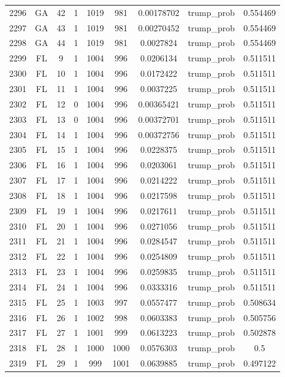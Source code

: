 \documentclass[12pt,a4paper]{article}
\begin{document}
\begin{tabular}{r|cccccccc}
	2296 & GA & 42 & 1 & 1019 & 981 & 0.00178702 & trump\_prob & 0.554469 \\
	2297 & GA & 43 & 1 & 1019 & 981 & 0.00270452 & trump\_prob & 0.554469 \\
	2298 & GA & 44 & 1 & 1019 & 981 & 0.0027824 & trump\_prob & 0.554469 \\
	2299 & FL & 9 & 1 & 1004 & 996 & 0.0206134 & trump\_prob & 0.511511 \\
	2300 & FL & 10 & 1 & 1004 & 996 & 0.0172422 & trump\_prob & 0.511511 \\
	2301 & FL & 11 & 1 & 1004 & 996 & 0.0037225 & trump\_prob & 0.511511 \\
	2302 & FL & 12 & 0 & 1004 & 996 & 0.00365421 & trump\_prob & 0.511511 \\
	2303 & FL & 13 & 0 & 1004 & 996 & 0.00372701 & trump\_prob & 0.511511 \\
	2304 & FL & 14 & 1 & 1004 & 996 & 0.00372756 & trump\_prob & 0.511511 \\
	2305 & FL & 15 & 1 & 1004 & 996 & 0.0228375 & trump\_prob & 0.511511 \\
	2306 & FL & 16 & 1 & 1004 & 996 & 0.0203061 & trump\_prob & 0.511511 \\
	2307 & FL & 17 & 1 & 1004 & 996 & 0.0214222 & trump\_prob & 0.511511 \\
	2308 & FL & 18 & 1 & 1004 & 996 & 0.0217598 & trump\_prob & 0.511511 \\
	2309 & FL & 19 & 1 & 1004 & 996 & 0.0217611 & trump\_prob & 0.511511 \\
	2310 & FL & 20 & 1 & 1004 & 996 & 0.0271056 & trump\_prob & 0.511511 \\
	2311 & FL & 21 & 1 & 1004 & 996 & 0.0284547 & trump\_prob & 0.511511 \\
	2312 & FL & 22 & 1 & 1004 & 996 & 0.0254809 & trump\_prob & 0.511511 \\
	2313 & FL & 23 & 1 & 1004 & 996 & 0.0259835 & trump\_prob & 0.511511 \\
	2314 & FL & 24 & 1 & 1004 & 996 & 0.0333316 & trump\_prob & 0.511511 \\
	2315 & FL & 25 & 1 & 1003 & 997 & 0.0557477 & trump\_prob & 0.508634 \\
	2316 & FL & 26 & 1 & 1002 & 998 & 0.0603383 & trump\_prob & 0.505756 \\
	2317 & FL & 27 & 1 & 1001 & 999 & 0.0613223 & trump\_prob & 0.502878 \\
	2318 & FL & 28 & 1 & 1000 & 1000 & 0.0576303 & trump\_prob & 0.5 \\
	2319 & FL & 29 & 1 & 999 & 1001 & 0.0639885 & trump\_prob & 0.497122 \\

\end{tabular}
\end{document}
